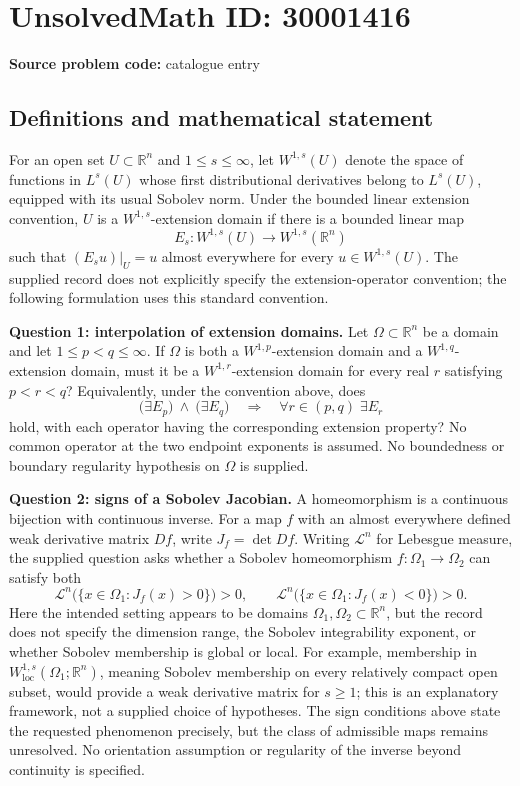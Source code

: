 \documentclass[11pt]{article}
\newcommand{\R}{\mathbb{R}}
\begin{document}
\section*{UnsolvedMath ID: 30001416}
\textbf{Source problem code:} catalogue entry
\subsection{Definitions and mathematical statement}
For an open set \(U\subset\R^n\) and \(1\le s\le\infty\), let \(W^{1,s}(U)\) denote the space of functions in \(L^s(U)\) whose first distributional derivatives belong to \(L^s(U)\), equipped with its usual Sobolev norm. Under the bounded linear extension convention, \(U\) is a \(W^{1,s}\)-extension domain if there is a bounded linear map
\[
E_s:W^{1,s}(U)\longrightarrow W^{1,s}(\R^n)
\]
such that \((E_su)|_U=u\) almost everywhere for every \(u\in W^{1,s}(U)\). The supplied record does not explicitly specify the extension-operator convention; the following formulation uses this standard convention.

\textbf{Question 1: interpolation of extension domains.} Let \(\Omega\subset\R^n\) be a domain and let \(1\le p<q\le\infty\). If \(\Omega\) is both a \(W^{1,p}\)-extension domain and a \(W^{1,q}\)-extension domain, must it be a \(W^{1,r}\)-extension domain for every real \(r\) satisfying \(p<r<q\)? Equivalently, under the convention above, does
\[
\bigl(\exists E_p\bigr)\ \land\ \bigl(\exists E_q\bigr)
\quad\Longrightarrow\quad
\forall r\in(p,q)\;\exists E_r
\]
hold, with each operator having the corresponding extension property? No common operator at the two endpoint exponents is assumed. No boundedness or boundary regularity hypothesis on \(\Omega\) is supplied.

\textbf{Question 2: signs of a Sobolev Jacobian.} A homeomorphism is a continuous bijection with continuous inverse. For a map \(f\) with an almost everywhere defined weak derivative matrix \(Df\), write \(J_f=\det Df\). Writing \(\mathcal L^n\) for Lebesgue measure, the supplied question asks whether a Sobolev homeomorphism \(f:\Omega_1\to\Omega_2\) can satisfy both
\[
\mathcal L^n\bigl(\{x\in\Omega_1:J_f(x)>0\}\bigr)>0,
\qquad
\mathcal L^n\bigl(\{x\in\Omega_1:J_f(x)<0\}\bigr)>0.
\]
Here the intended setting appears to be domains \(\Omega_1,\Omega_2\subset\R^n\), but the record does not specify the dimension range, the Sobolev integrability exponent, or whether Sobolev membership is global or local. For example, membership in \(W^{1,s}_{\mathrm{loc}}(\Omega_1;\R^n)\), meaning Sobolev membership on every relatively compact open subset, would provide a weak derivative matrix for \(s\ge1\); this is an explanatory framework, not a supplied choice of hypotheses. The sign conditions above state the requested phenomenon precisely, but the class of admissible maps remains unresolved. No orientation assumption or regularity of the inverse beyond continuity is specified.
\end{document}
